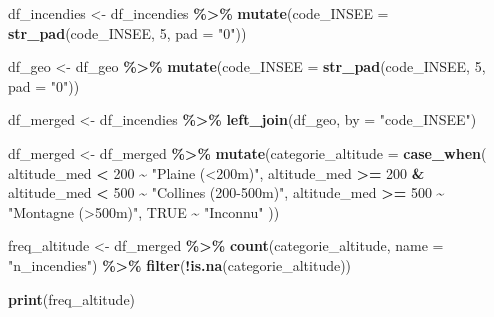 \documentclass[
]{article}
\newenvironment{Shaded}{\begin{snugshade}}{\end{snugshade}}
\newcommand{\AttributeTok}[1]{\textcolor[rgb]{0.13,0.29,0.53}{#1}}
\newcommand{\ConstantTok}[1]{\textcolor[rgb]{0.56,0.35,0.01}{#1}}
\newcommand{\DecValTok}[1]{\textcolor[rgb]{0.00,0.00,0.81}{#1}}
\newcommand{\FunctionTok}[1]{\textcolor[rgb]{0.13,0.29,0.53}{\textbf{#1}}}
\newcommand{\NormalTok}[1]{#1}
\newcommand{\OtherTok}[1]{\textcolor[rgb]{0.56,0.35,0.01}{#1}}
\newcommand{\SpecialCharTok}[1]{\textcolor[rgb]{0.81,0.36,0.00}{\textbf{#1}}}
\newcommand{\StringTok}[1]{\textcolor[rgb]{0.31,0.60,0.02}{#1}}
\begin{document}
\begin{Shaded}
\begin{Highlighting}[]
\NormalTok{df\_incendies }\OtherTok{\textless{}{-}}\NormalTok{ df\_incendies }\SpecialCharTok{\%\textgreater{}\%}
  \FunctionTok{mutate}\NormalTok{(}\AttributeTok{code\_INSEE =} \FunctionTok{str\_pad}\NormalTok{(code\_INSEE, }\DecValTok{5}\NormalTok{, }\AttributeTok{pad =} \StringTok{"0"}\NormalTok{))}

\NormalTok{df\_geo }\OtherTok{\textless{}{-}}\NormalTok{ df\_geo }\SpecialCharTok{\%\textgreater{}\%}
  \FunctionTok{mutate}\NormalTok{(}\AttributeTok{code\_INSEE =} \FunctionTok{str\_pad}\NormalTok{(code\_INSEE, }\DecValTok{5}\NormalTok{, }\AttributeTok{pad =} \StringTok{"0"}\NormalTok{))}

\NormalTok{df\_merged }\OtherTok{\textless{}{-}}\NormalTok{ df\_incendies }\SpecialCharTok{\%\textgreater{}\%}
  \FunctionTok{left\_join}\NormalTok{(df\_geo, }\AttributeTok{by =} \StringTok{"code\_INSEE"}\NormalTok{)}

\NormalTok{df\_merged }\OtherTok{\textless{}{-}}\NormalTok{ df\_merged }\SpecialCharTok{\%\textgreater{}\%}
  \FunctionTok{mutate}\NormalTok{(}\AttributeTok{categorie\_altitude =} \FunctionTok{case\_when}\NormalTok{(}
\NormalTok{    altitude\_med }\SpecialCharTok{\textless{}} \DecValTok{200} \SpecialCharTok{\textasciitilde{}} \StringTok{"Plaine (\textless{}200m)"}\NormalTok{,}
\NormalTok{    altitude\_med }\SpecialCharTok{\textgreater{}=} \DecValTok{200} \SpecialCharTok{\&}\NormalTok{ altitude\_med }\SpecialCharTok{\textless{}} \DecValTok{500} \SpecialCharTok{\textasciitilde{}} \StringTok{"Collines (200{-}500m)"}\NormalTok{,}
\NormalTok{    altitude\_med }\SpecialCharTok{\textgreater{}=} \DecValTok{500} \SpecialCharTok{\textasciitilde{}} \StringTok{"Montagne (\textgreater{}500m)"}\NormalTok{,}
    \ConstantTok{TRUE} \SpecialCharTok{\textasciitilde{}} \StringTok{"Inconnu"}
\NormalTok{  ))}

\NormalTok{freq\_altitude }\OtherTok{\textless{}{-}}\NormalTok{ df\_merged }\SpecialCharTok{\%\textgreater{}\%}
  \FunctionTok{count}\NormalTok{(categorie\_altitude, }\AttributeTok{name =} \StringTok{"n\_incendies"}\NormalTok{) }\SpecialCharTok{\%\textgreater{}\%}
  \FunctionTok{filter}\NormalTok{(}\SpecialCharTok{!}\FunctionTok{is.na}\NormalTok{(categorie\_altitude))}

\FunctionTok{print}\NormalTok{(freq\_altitude)}
\end{Highlighting}
\end{Shaded}
\end{document}
